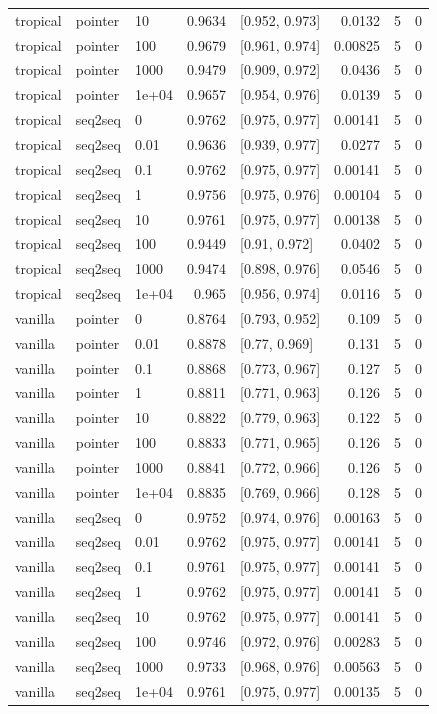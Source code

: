 \documentclass[10pt]{article}
\begin{document}
{\begin{longtable}{lllrlrrr}
tropical & pointer & 10 & 0.9634 & [0.952, 0.973] & 0.0132 & 5 & 0\\
tropical & pointer & 100 & 0.9679 & [0.961, 0.974] & 0.00825 & 5 & 0\\
tropical & pointer & 1000 & 0.9479 & [0.909, 0.972] & 0.0436 & 5 & 0\\
tropical & pointer & 1e+04 & 0.9657 & [0.954, 0.976] & 0.0139 & 5 & 0\\
tropical & seq2seq & 0 & 0.9762 & [0.975, 0.977] & 0.00141 & 5 & 0\\
tropical & seq2seq & 0.01 & 0.9636 & [0.939, 0.977] & 0.0277 & 5 & 0\\
tropical & seq2seq & 0.1 & 0.9762 & [0.975, 0.977] & 0.00141 & 5 & 0\\
tropical & seq2seq & 1 & 0.9756 & [0.975, 0.976] & 0.00104 & 5 & 0\\
tropical & seq2seq & 10 & 0.9761 & [0.975, 0.977] & 0.00138 & 5 & 0\\
tropical & seq2seq & 100 & 0.9449 & [0.91, 0.972] & 0.0402 & 5 & 0\\
tropical & seq2seq & 1000 & 0.9474 & [0.898, 0.976] & 0.0546 & 5 & 0\\
tropical & seq2seq & 1e+04 & 0.965 & [0.956, 0.974] & 0.0116 & 5 & 0\\
vanilla & pointer & 0 & 0.8764 & [0.793, 0.952] & 0.109 & 5 & 0\\
vanilla & pointer & 0.01 & 0.8878 & [0.77, 0.969] & 0.131 & 5 & 0\\
vanilla & pointer & 0.1 & 0.8868 & [0.773, 0.967] & 0.127 & 5 & 0\\
vanilla & pointer & 1 & 0.8811 & [0.771, 0.963] & 0.126 & 5 & 0\\
vanilla & pointer & 10 & 0.8822 & [0.779, 0.963] & 0.122 & 5 & 0\\
vanilla & pointer & 100 & 0.8833 & [0.771, 0.965] & 0.126 & 5 & 0\\
vanilla & pointer & 1000 & 0.8841 & [0.772, 0.966] & 0.126 & 5 & 0\\
vanilla & pointer & 1e+04 & 0.8835 & [0.769, 0.966] & 0.128 & 5 & 0\\
vanilla & seq2seq & 0 & 0.9752 & [0.974, 0.976] & 0.00163 & 5 & 0\\
vanilla & seq2seq & 0.01 & 0.9762 & [0.975, 0.977] & 0.00141 & 5 & 0\\
vanilla & seq2seq & 0.1 & 0.9761 & [0.975, 0.977] & 0.00141 & 5 & 0\\
vanilla & seq2seq & 1 & 0.9762 & [0.975, 0.977] & 0.00141 & 5 & 0\\
vanilla & seq2seq & 10 & 0.9762 & [0.975, 0.977] & 0.00141 & 5 & 0\\
vanilla & seq2seq & 100 & 0.9746 & [0.972, 0.976] & 0.00283 & 5 & 0\\
vanilla & seq2seq & 1000 & 0.9733 & [0.968, 0.976] & 0.00563 & 5 & 0\\
vanilla & seq2seq & 1e+04 & 0.9761 & [0.975, 0.977] & 0.00135 & 5 & 0\\
\bottomrule
\end{longtable}
}
\end{document}
